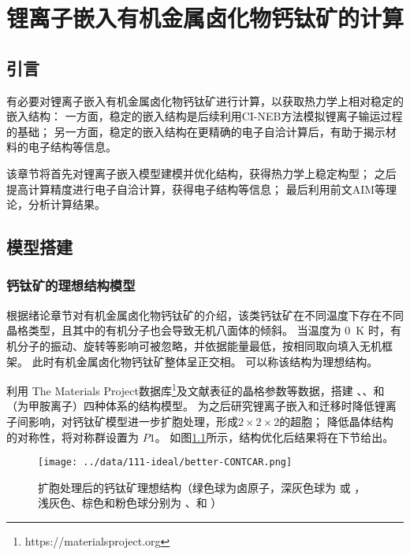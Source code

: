 \chapter{锂离子嵌入有机金属卤化物钙钛矿的计算}
\label{ch:pos}

\section{引言}

有必要对锂离子嵌入有机金属卤化物钙钛矿进行计算，以获取热力学上相对稳定的嵌入结构：
一方面，稳定的嵌入结构是后续利用CI-NEB方法模拟锂离子输运过程的基础；
另一方面，稳定的嵌入结构在更精确的电子自洽计算后，有助于揭示材料的电子结构等信息。

该章节将首先对锂离子嵌入模型建模并优化结构，获得热力学上稳定构型；
之后提高计算精度进行电子自洽计算，获得电子结构等信息；
最后利用前文AIM等理论，分析计算结果。

\section{模型搭建}

\subsection{钙钛矿的理想结构模型}

根据绪论章节对有机金属卤化物钙钛矿的介绍，该类钙钛矿在不同温度下存在不同晶格类型，且其中的有机分子也会导致无机八面体的倾斜。
当温度为 \SI{0}{K} 时，有机分子的振动、旋转等影响可被忽略，并依据能量最低，按相同取向填入无机框架。
此时有机金属卤化物钙钛矿整体呈正交相。
可以称该结构为理想结构。

利用 The Materials Project数据库\footnote{https://materialsproject.org}及文献\cite{yinMetalChloridePerovskite2020}表征的晶格参数等数据，搭建 、、和  （为甲胺离子）四种体系的结构模型。
为之后研究锂离子嵌入和迁移时降低锂离子间影响，对钙钛矿模型进一步扩胞处理，形成$2\times2\times2$的超胞；
降低晶体结构的对称性，将对称群设置为 $P1$。
如图\ref{fig:ideal-struc}所示，结构优化后结果将在下节给出。

\begin{figure}[ht]
    \centering
    \texttt{[image: ../data/111-ideal/better-CONTCAR.png]}
    \caption{扩胞处理后的钙钛矿理想结构（绿色球为卤原子，深灰色球为 或 ，浅灰色、棕色和粉色球分别为 、和 ）}
    \label{fig:ideal-struc}
\end{figure}

